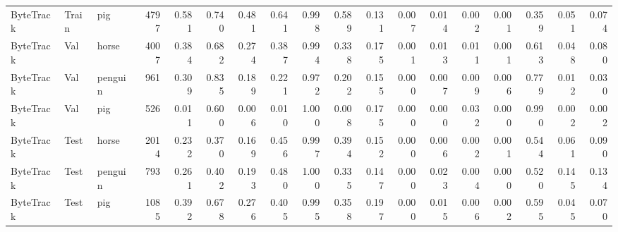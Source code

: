 \begin{table}
\begin{tabular}{lllrrrrrrrrrrrrrrr}
ByteTrack & Train & pig & 4797 & 0.581 & 0.740 & 0.481 & 0.641 & 0.998 & 0.589 & 0.131 & 0.007 & 0.014 & 0.002 & 0.001 & 0.359 & 0.051 & 0.074 \\
ByteTrack & Val & horse & 4007 & 0.384 & 0.682 & 0.274 & 0.387 & 0.994 & 0.338 & 0.175 & 0.001 & 0.013 & 0.011 & 0.001 & 0.613 & 0.048 & 0.080 \\
ByteTrack & Val & penguin & 961 & 0.309 & 0.835 & 0.189 & 0.221 & 0.972 & 0.202 & 0.155 & 0.000 & 0.007 & 0.009 & 0.006 & 0.779 & 0.012 & 0.030 \\
ByteTrack & Val & pig & 526 & 0.011 & 0.600 & 0.006 & 0.010 & 1.000 & 0.008 & 0.175 & 0.000 & 0.000 & 0.032 & 0.000 & 0.990 & 0.002 & 0.002 \\
ByteTrack & Test & horse & 2014 & 0.232 & 0.370 & 0.169 & 0.456 & 0.997 & 0.394 & 0.152 & 0.000 & 0.006 & 0.002 & 0.001 & 0.544 & 0.061 & 0.090 \\
ByteTrack & Test & penguin & 793 & 0.261 & 0.402 & 0.193 & 0.480 & 1.000 & 0.335 & 0.147 & 0.000 & 0.023 & 0.004 & 0.000 & 0.520 & 0.145 & 0.134 \\
ByteTrack & Test & pig & 1085 & 0.392 & 0.678 & 0.276 & 0.405 & 0.995 & 0.358 & 0.197 & 0.000 & 0.015 & 0.006 & 0.002 & 0.595 & 0.045 & 0.070 \\
\bottomrule
\end{tabular}
\end{table}
